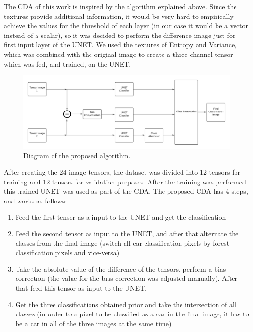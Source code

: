 The CDA of this work is inspired by the algorithm explained above. Since the textures provide additional information, it would be very 
hard to empirically achieve the values for the threshold of each layer (in our case it would be a vector instead of a scalar), so it was decided to perform the difference image
just for first input layer of the UNET.
We used the textures of Entropy and Variance, which was combined with the original image to create a three-channel tensor which was fed, and trained, on the UNET.

\begin{figure}[ht]
    \centering
    \includegraphics[width=\linewidth]{Chapter7/diagrama.png}
    \caption{ Diagram of the proposed algorithm.}
    \label{fig:diagrama}
\end{figure}

After creating the 24 image tensors, the dataset was divided into 12 tensors for training and 12 tensors for validation purposes. 
After the training was performed this trained UNET was used as part of the CDA.
The proposed CDA has 4 steps, and works as follows:
\begin{enumerate}
    \item Feed the first tensor as a input to the UNET and get the classification
    \item Feed the second tensor as input to the UNET, and after that alternate the classes from the final image (switch all car classification pixels by forest classification pixels and vice-versa)
    \item Take the absolute value of the difference of the tensors, perform a bias correction (the value for the bias correction was adjusted manually). After that feed this tensor as input to the UNET.
    \item Get the three classifications obtained prior and take the intersection of all classes (in order to a pixel to be classified as a car in the final image, it has to be a car in all of the three images at the same time)
\end{enumerate}

